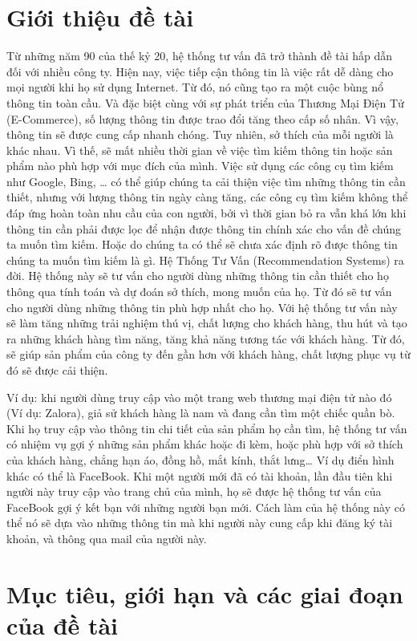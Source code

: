 \documentclass[a4paper,12pt,numbered,print,index,custombib, oneside, custommargin]{report}
\begin{document}
\section{Giới thiệu đề tài}
Từ những năm 90 của thế kỷ 20, hệ thống tư vấn đã trở thành đề tài hấp dẫn đối với nhiều công ty. Hiện nay, việc tiếp cận thông tin là việc rất dễ dàng cho mọi người khi họ sử dụng Internet. Từ đó, nó cũng tạo ra một cuộc bùng nổ thông tin toàn cầu. Và đặc biệt cùng với sự phát triển của Thương Mại Điện Tử (E-Commerce), số lượng thông tin được trao đổi tăng theo cấp số nhân. Vì vậy, thông tin sẽ được cung cấp nhanh chóng.
Tuy nhiên, sở thích của mỗi người là khác nhau. Vì thế, sẽ mất nhiều thời gian về việc tìm kiếm thông tin hoặc sản phẩm nào phù hợp với mục đích của mình. Việc sử dụng các công cụ tìm kiếm như Google, Bing, … có thể giúp chúng ta cải thiện việc tìm những thông tin cần thiết, nhưng với lượng thông tin ngày càng tăng, các công cụ tìm kiếm không thể đáp ứng hoàn toàn nhu cầu của con người, bởi vì thời gian bỏ ra vẫn khá lớn khi thông tin cần phải được lọc để nhận được thông tin chính xác cho vấn đề chúng ta muốn tìm kiếm. Hoặc do chúng ta có thể sẽ chưa xác định rõ được thông tin chúng ta muốn tìm kiếm là gì. 
Hệ Thống Tư Vấn (Recommendation Systems) ra đời. Hệ thống này sẽ tư vấn cho người dùng những thông tin cần thiết cho họ thông qua tính toán và dự đoán sở thích, mong muốn của họ. 
Từ đó sẽ tư vấn cho người dùng những thông tin phù hợp nhất cho họ. 
Với hệ thống tư vấn này sẽ làm tăng những trải nghiệm thú vị, chất lượng cho khách hàng, thu hút và tạo ra những khách hàng tìm năng, tăng khả năng tương tác với khách hàng. Từ đó, sẽ giúp sản phẩm của công ty đến gần hơn với khách hàng, chất lượng phục vụ từ đó sẽ được cải thiện.

Ví dụ: khi người dùng truy cập vào một trang web thương mại điện tử nào đó (Ví dụ: Zalora), giả sử khách hàng là nam và đang cần tìm một chiếc quần bò. Khi họ truy cập vào thông tin chi tiết của sản phẩm họ cần tìm, hệ thống tư vấn có nhiệm vụ gợi ý những sản phẩm khác hoặc đi kèm, hoặc phù hợp với sở thích của khách hàng, chẳng hạn áo, đồng hồ, mắt kính, thắt lưng… 
Ví dụ điển hình khác có thể là FaceBook. Khi một người mới đã có tài khoản, lần đầu tiên khi người này truy cập vào trang chủ của mình, họ sẽ được hệ thống tư vấn của FaceBook gợi ý kết bạn với những người bạn mới. Cách làm của hệ thống này có thể nó sẽ dựa vào những thông tin mà khi người này cung cấp khi đăng ký tài khoản, và thông qua mail của người này.

\section{Mục tiêu, giới hạn và các giai đoạn của đề tài}
\end{document}
